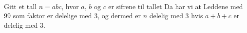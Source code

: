 





\\
Gitt et tall $n=abc $, hvor $ a $, $ b $ og $ c $ er sifrene til tallet 
Da har vi at
Leddene med 99 som faktor er delelige med 3, og dermed er $ n $ delelig med 3 hvis $ a+b+c $ er delelig med 3.



